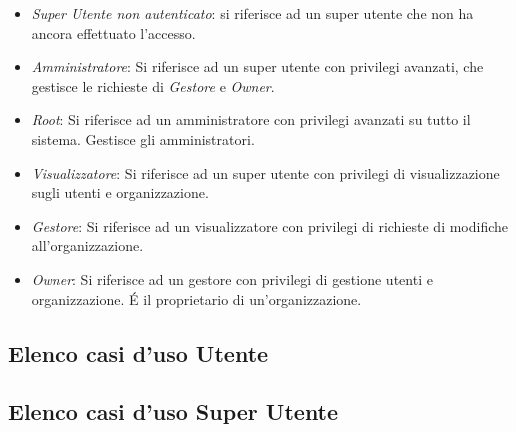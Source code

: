 \documentclass[../analisi-dei-requisiti]{subfiles}
\begin{document}
\begin{itemize}
  \item \emph{Super Utente non autenticato}: si riferisce ad un super utente che non ha ancora effettuato l'accesso.
  \item \emph{Amministratore}: Si riferisce ad un super utente con privilegi avanzati, che gestisce le richieste di \emph{Gestore} e \emph{Owner}.
  \item \emph{Root}: Si riferisce ad un amministratore con privilegi avanzati su tutto il sistema. Gestisce gli amministratori.
  \item \emph{Visualizzatore}: Si riferisce ad un super utente con privilegi di visualizzazione sugli utenti e organizzazione.
  \item \emph{Gestore}: Si riferisce ad un visualizzatore con privilegi di richieste di modifiche all'organizzazione.
  \item \emph{Owner}: Si riferisce ad un gestore con privilegi di gestione utenti e organizzazione. É il proprietario di un'organizzazione.
\end{itemize}

\subsection{Elenco casi d'uso Utente}
\label{sub:casi_duso_utente}


\subsection{Elenco casi d'uso Super Utente}
\label{sub:casi_duso_superutente}


\end{document}
